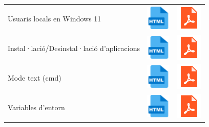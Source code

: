 \documentclass[
  12 pt,
  a4paper,
]{article}
\begin{document}
\begin{longtable}[]{@{}
  >{\raggedright\arraybackslash}p{}
  >{\raggedright\arraybackslash}p{}
  >{\raggedright\arraybackslash}p{}@{}}
\toprule\noalign{}
\endhead
\bottomrule\noalign{}
\endlastfoot
Usuaris locals en Windows 11 &
\href{https://tofermos.github.io/Windows11/gestions/comptesLocals.html}{\includegraphics{recursos/iconohtml.png}}
&
\href{https://tofermos.github.io/Windows11/gestions/comptesLocals.pdf}{\includegraphics{recursos/iconopdf.png}} \\
Instal·lació/Desinstal·lació d'aplicacions &
\href{https://tofermos.github.io/Windows11/software/software.html}{\includegraphics{recursos/iconohtml.png}}
&
\href{https://tofermos.github.io/Windows11/software/software.pdf}{\includegraphics{recursos/iconopdf.png}} \\
Mode text (cmd) &
\href{https://tofermos.github.io/Windows11/cmd/cmd.html}{\includegraphics{recursos/iconohtml.png}}
&
\href{https://tofermos.github.io/Windows11/cmd/cmd.pdf}{\includegraphics{recursos/iconopdf.png}} \\
Variables d'entorn &
\href{https://tofermos.github.io/Windows11/cmd/set.html}{\includegraphics{recursos/iconohtml.png}}
&
\href{https://tofermos.github.io/Windows11/cmd/set.pdf}{\includegraphics{recursos/iconopdf.png}} \\
\end{longtable}
\end{document}
